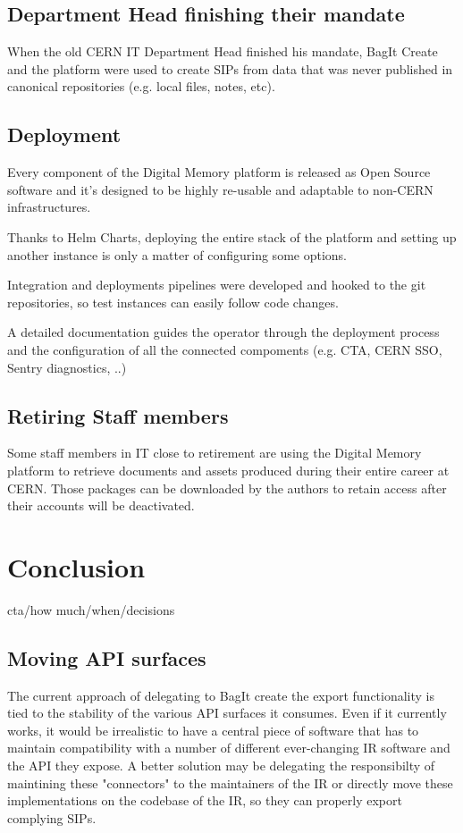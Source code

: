 \documentclass[11pt]{IEEEtran}
\begin{document}
\subsection{Department Head finishing their mandate}

When the old CERN IT Department Head finished his mandate, BagIt Create and the platform were used to create SIPs from data that was never published in canonical repositories (e.g. local files, notes, etc).

\subsection{Deployment}

Every component of the Digital Memory platform is released as Open Source software and it's designed to be highly re-usable and adaptable to non-CERN infrastructures.

Thanks to Helm Charts, deploying the entire stack of the platform and setting up another instance is only a matter of configuring some options.

Integration and deployments pipelines were developed and hooked to the git repositories, so test instances can easily follow code changes.

A detailed documentation guides the operator through the deployment process and the configuration of all the connected compoments (e.g. CTA, CERN SSO, Sentry diagnostics, ..)


\subsection{Retiring Staff members}

Some staff members in IT close to retirement are using the Digital Memory platform to retrieve documents and assets produced during their entire career at CERN. Those packages can be downloaded by the authors to retain access after their accounts will be deactivated.


\section{Conclusion}

cta/how much/when/decisions

\subsection{Moving API surfaces}
The current approach of delegating to BagIt create the export functionality is tied to the stability of the various API surfaces it consumes. Even if it currently works, it would be irrealistic to have a central piece of software that has to maintain compatibility with a number of different ever-changing IR software and the API they expose. A better solution may be delegating the responsibilty of maintining these "connectors" to the maintainers of the IR or directly move these implementations on the codebase of the IR, so they can properly export complying SIPs.
\end{document}
